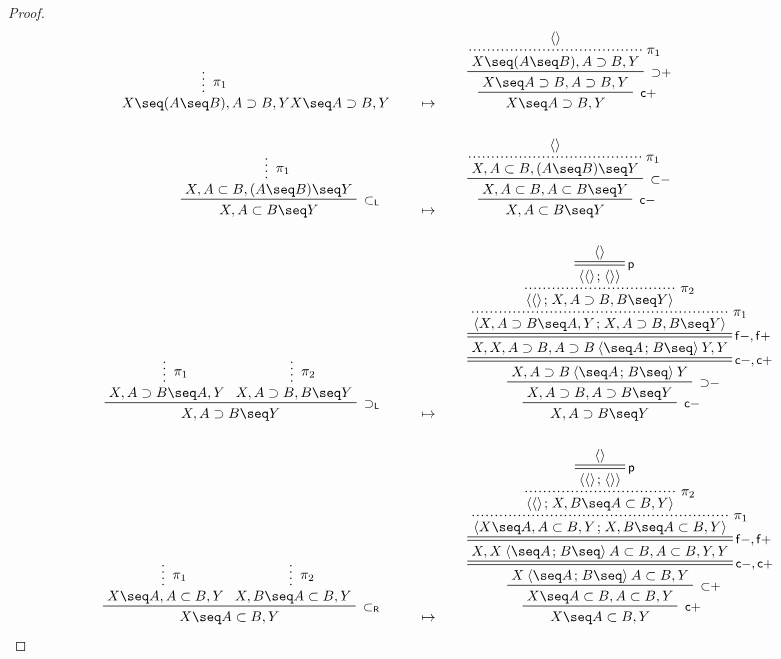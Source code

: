 \begin{proof}
\begin{align*}
      {\summ[$\pi_1$]{X \seq (A \seq B), A \limp B, Y}}
      {X \seq A \limp B, Y}
    &\mt
    \R[\rsf{c{+}}]
    {\R[\rsf{{\limp}{+}}]
    {\prftree[r][dotted]{$\pi_1$}
    {\piq{}}
    {X \seq (A \seq B), A \limp B, Y}}
    {X \seq A \limp B, A \limp B, Y}}
    {X \seq A \limp B, Y}
    \\\\
    \R[\rsf{\lsub_L}]
      {\summ[$\pi_1$]{X, A \lsub B, (A \seq B) \seq Y}}
      {X, A \lsub B \seq Y}
    &\mt
    \R[\rsf{c{-}}]
    {\R[\rsf{{\lsub}{-}}]
    {\prftree[r][dotted]{$\pi_1$}
    {\piq{}}
    {X, A \lsub B, (A \seq B) \seq Y}}
    {X, A \lsub B, A \lsub B \seq Y}}
    {X, A \lsub B \seq Y}
    \\\\
    \R[\rsf{\limp_L}]
      {\summ[$\pi_1$]{X, A \limp B \seq A, Y}}
      {\summ[$\pi_2$]{X, A \limp B, B \seq Y}}
      {X, A \limp B \seq Y}
    &\mt
    \R[\rsf{c{-}}]
    {\R[\rsf{{\limp}{-}}]
    {\prftree[r][d]{\rsf{c{-},c{+}}}
    {\prftree[r][d]{\rsf{f{-},f{+}}}
    {\prftree[r][dotted]{$\pi_1$}
    {\prftree[r][dotted]{$\pi_2$}
    {\prftree[r][d]{\rsf{p}}
    {\piq{}}
    {\piq{\piq{} \sep \piq{}}}}
    {\piq{\piq{} \sep X, A \limp B, B \seq Y}}}
    {\piq{X, A \limp B \seq A, Y \sep X, A \limp B, B \seq Y}}}
    {X, X, A \limp B, A \limp B \piq{\seq A \sep B \seq} Y, Y}}
    {X, A \limp B \piq{\seq A \sep B \seq} Y}}
    {X, A \limp B, A \limp B \seq Y}}
    {X, A \limp B \seq Y}
    \\\\
    \R[\rsf{\lsub_R}]
      {\summ[$\pi_1$]{X \seq A, A \lsub B, Y}}
      {\summ[$\pi_2$]{X, B \seq A \lsub B, Y}}
      {X \seq A \lsub B, Y}
    &\mt
    \R[\rsf{c{+}}]
    {\R[\rsf{{\lsub}{+}}]
    {\prftree[r][d]{\rsf{c{-},c{+}}}
    {\prftree[r][d]{\rsf{f{-},f{+}}}
    {\prftree[r][dotted]{$\pi_1$}
    {\prftree[r][dotted]{$\pi_2$}
    {\prftree[r][d]{\rsf{p}}
    {\piq{}}
    {\piq{\piq{} \sep \piq{}}}}
    {\piq{\piq{} \sep X, B \seq A \lsub B, Y}}}
    {\piq{X \seq A, A \lsub B, Y \sep X, B \seq A \lsub B, Y}}}
    {X, X \piq{\seq A \sep B \seq} A \lsub B, A \lsub B, Y, Y}}
    {X \piq{\seq A \sep B \seq} A \lsub B, Y}}
    {X \seq A \lsub B, A \lsub B, Y}}
    {X \seq A \lsub B, Y}
  \end{align*}
\end{proof}

